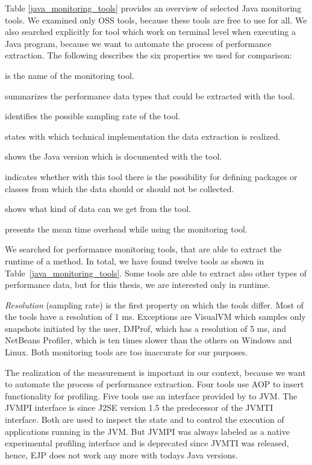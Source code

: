 Table \ref{java_monitoring_tools} provides an overview of selected Java monitoring tools. We examined only \ac{OSS} tools, because these tools are free to use for all. We also searched explicitly for tool which work on terminal level when executing a Java program, because we want to automate the process of performance extraction. The following describes the six properties we used for comparison:
\begin{description}[style=multiline,leftmargin=8em]
	\item [Tool] is the name of the monitoring tool.
	\item [Performance Type] summarizes the performance data types that could be extracted with the tool.
	\item [Resolution] identifies the possible sampling rate of the tool.
	\item [Realization] states with which technical implementation the data extraction is realized.
	\item [Version] shows the Java version which is documented with the tool.
	\item [Filter] indicates whether with this tool there is the possibility for defining packages or classes from which the data should or should not be collected.
	\item [Output] shows what kind of data can we get from the tool.
    \item [Overhead Factor] presents the mean time overhead while using the monitoring tool.
\end{description}


We searched for performance monitoring tools, that are able to extract the runtime of a method. In total, we have found twelve tools as shown in Table~\ref{java_monitoring_tools}. Some tools are able to extract also other types of performance data, but for this thesis, we are interested only in runtime. 

\textit{Resolution} (sampling rate) is the first property on which the tools differ. Most of the tools have a resolution of 1 ms. Exceptions are VisualVM which samples only snapshots initiated by the user, DJProf, which has a resolution of 5 ms, and NetBeans Profiler, which is ten times slower than the others on Windows and Linux. Both monitoring tools are too inaccurate for our purposes. 

The realization of the measurement is important in our context, because we want to automate the process of performance extraction. Four tools use \ac{AOP} to insert functionality for profiling. Five tools use an interface provided by to \ac{JVM}. The JVMPI interface is since J2SE version 1.5 the predecessor of the JVMTI interface. Both are used to inspect the state and to control the execution of applications running in the \ac{JVM}. But JVMPI was always labeled as a native experimental profiling interface and is deprecated since JVMTI was released, hence, EJP does not work any more with todays Java versions.

